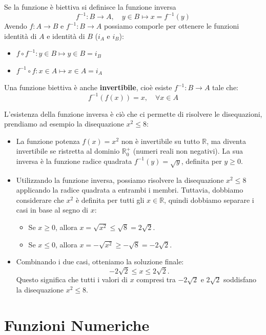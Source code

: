 Se la funzione è biettiva si definisce la funzione inversa
\[
f^{-1}: B \to A, \quad y \in B \mapsto x = f^{-1}(y)
\]
Avendo $f: A \to B$ e $f^{-1}: B \to A$ possiamo comporle per ottenere le funzioni identità di $A$ e identità di $B$ ($i_A$ e $i_B$):
\begin{itemize}
    \item $f \circ f^{-1}: y \in B \mapsto y \in B = i_B$
    \item $f^{-1} \circ f: x \in A \mapsto x \in A = i_A$
\end{itemize}

Una funzione biettiva è anche \textbf{invertibile}, cioè esiste $f^{-1}: B \to A$ tale che:
\[
f^{-1}(f(x)) = x, \quad \forall x \in A
\]

L'esistenza della funzione inversa è ciò che ci permette di risolvere le disequazioni, prendiamo ad esempio la disequazione $x^2 \leq 8$:
\begin{itemize}
    \item La funzione potenza $f(x) = x^2$ non è invertibile su tutto $\mathbb{R}$, ma diventa invertibile se ristretta al dominio $\mathbb{R}^+_0$ (numeri reali non negativi). La sua inversa è la funzione radice quadrata $f^{-1}(y) = \sqrt{y}$, definita per $y \geq 0$.

    \item Utilizzando la funzione inversa, possiamo risolvere la disequazione $x^2 \leq 8$ applicando la radice quadrata a entrambi i membri. Tuttavia, dobbiamo considerare che $x^2$ è definita per tutti gli $x \in \mathbb{R}$, quindi dobbiamo separare i casi in base al segno di $x$:
    \begin{itemize}
        \item Se $x \geq 0$, allora $x = \sqrt{x^2} \leq \sqrt{8} = 2\sqrt{2}$.
        \item Se $x \leq 0$, allora $x = -\sqrt{x^2} \geq -\sqrt{8} = -2\sqrt{2}$.
    \end{itemize}

    \item Combinando i due casi, otteniamo la soluzione finale:
    \[
    -2\sqrt{2} \leq x \leq 2\sqrt{2}.
    \]
    Questo significa che tutti i valori di $x$ compresi tra $-2\sqrt{2}$ e $2\sqrt{2}$ soddisfano la disequazione $x^2 \leq 8$.
  \end{itemize}

\section{Funzioni Numeriche}
